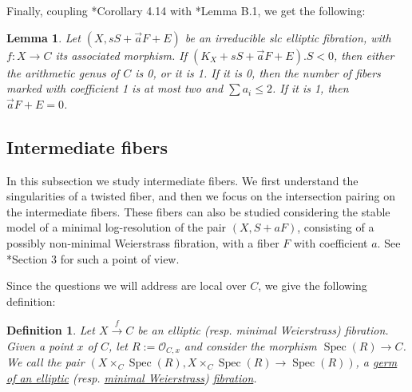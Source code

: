 \documentclass[11pt]{amsart}
\newcommand{\cO}{\mathcal{O}}
\newcommand{\spec}{\operatorname{Spec}}
\newtheorem{Def}[theorem]{Definition}
\newtheorem{Lemma}[theorem]{Lemma}
\theoremstyle{definition}
\begin{document}
Finally, coupling \cite{AB3}*{Corollary 4.14} with \cite{AB3}*{Lemma B.1}, we get the following:
\begin{Lemma}\label{Lemma:conditions:when:to:contract:section}
 Let $(X,sS+\vec{a}F+E)$ be an irreducible slc elliptic fibration, with $f:X \to C$ its associated morphism.
 If $(K_X+sS+\vec{a}F+E).S<0$, then either the arithmetic genus of $C$ is 0, or it is 1. If it is 0, then the number of fibers marked with coefficient 1 is at most two and $\sum a_i \le 2$. If it is 1, then $\vec{a}F+E=0$.
\end{Lemma}
\subsection{Intermediate fibers}\label{Subsection:intermediate:fibers}
In this subsection we study intermediate fibers. We first understand the singularities of a twisted fiber, and then we focus on the intersection pairing on the intermediate fibers. These fibers can also be studied considering the stable model of a minimal log-resolution of the pair $(X,S+aF)$, consisting of a possibly non-minimal Weierstrass fibration, with a fiber $F$ with coefficient $a$. See \cite{AB3}*{Section 3} for such a point of view. 

Since the questions we will address are local over $C$, we give the following definition:
\begin{Def}\label{Def:germ}
Let $X \xrightarrow{f} C$ be an elliptic (resp. minimal Weierstrass) fibration. Given a point $x$ of $C$, let $R:=\cO_{C,x}$ and consider the morphism $\spec(R) \to C$. We call the pair
$(X\times_C \spec(R),X\times_C \spec(R) \to \spec(R))$, a \underline{germ of an elliptic} (resp. \underline{minimal Weierstrass}) \underline{fibration}. 
\end{Def}
 
\end{document}
